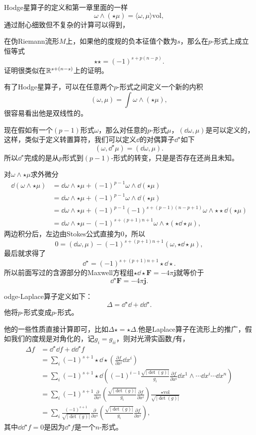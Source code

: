 Hodge星算子的定义和第一章里面的一样
\[
	\omega\wedge(\star \mu)=\langle \omega,\mu\rangle \mathrm{vol},
\]
通过耐心细致但不复杂的计算可以得到，

\pro 在伪Riemann流形$M$上，如果他的度规的负本征值个数为$s$，那么在$p$-形式上成立恒等式
	\[\star\star=(-1)^{s+p(n-p)}.\]
证明很类似在$\mathbb{R}^{s+(n-s)}$上的证明。

有了Hodge星算子，可以在任意两个$p$-形式之间定义一个新的内积
\[
	(\omega,\mu)=\int \omega\wedge(\star \mu),
\]
很容易看出他是双线性的。

现在假如有一个$(p-1)$形式$\omega$，那么对任意的$p$-形式$\mu$，$(\dd \omega,\mu)$是可以定义的，这样，类似于定义转置算符，我们可以定义$\dd$的对偶算子$\dd^\star$如下
\[
	(\omega,\dd^\star\mu)=(\dd \omega,\mu).
\]
所以$\dd^\star$完成的是从$p$形式到$(p-1)$-形式的转变，只是是否存在还尚且未知。

对$\omega\wedge\star\mu$求外微分
\begin{align*}
	\dd (\omega\wedge\star\mu)&=\dd \omega\wedge\star\mu+(-1)^{p-1}\omega\wedge\dd(\star\mu)\\
	&=\dd \omega\wedge\star\mu+(-1)^{p-1}\omega\wedge\dd(\star\mu)\\
	&=\dd \omega\wedge\star\mu+(-1)^{p-1}(-1)^{s+(p-1)(n-p+1)}\omega\wedge\star\star\dd(\star\mu)\\
	&=\dd \omega\wedge\star\mu-(-1)^{s+(p+1)n+1}\omega\wedge\star(\star\dd\star\mu),
\end{align*}
两边积分后，左边由Stokes公式直接为0，所以
\[
	0=(\dd \omega,\mu)-(-1)^{s+(p+1)n+1}(\omega,\star\dd\star\mu),
\]
最后就求得了
\[
	\dd^\star=(-1)^{s+(p+1)n+1}\star\dd\star.
\]
所以前面写过的含源部分的Maxwell方程组$\star\dd \star \mathbf{F}=-4\pi\mathbf{j}$就等价于
\[
	\dd^\star \mathbf{F}=-4\pi\mathbf{j}.
\]

\para odge-Laplace算子定义如下：
\[
	\Delta=\dd^\star\dd+\dd\dd^\star.
\]
他将$p$-形式变成$p$-形式。

他的一些性质直接计算即可，比如$\Delta\star=\star\Delta$.他是Laplace算子在流形上的推广，假如我们的度规是对角化的，记$g_i=g_{i i}$，则对光滑实函数$f$有，
\begin{align*}
	\Delta f&=\dd^\star\dd f+\dd\dd^\star f\\
	&=\sum_i(-1)^{s+1}\star\dd\star\left(\frac{\partial f}{\partial x^i}\dd x^i\right)\\
	&=\sum_i(-1)^{s+1}\star\dd\left((-1)^{i-1}\frac{\sqrt{|\det(g)|}}{g_i} \frac{\partial f}{\partial x^i}\dd x^1\wedge\cdots\hat{\dd x^i}\cdots\dd x^n\right)\\
	&=\sum_i(-1)^{s+1}\frac{\partial}{\partial x^i}\left(\frac{\sqrt{|\det(g)|}}{g_i} \frac{\partial f}{\partial x^i}\right)\frac{\star\mathrm{vol}}{\sqrt{|\det(g)|}}\\
	&=\sum_i\frac{(-1)^{s+1}}{\sqrt{|\det(g)|}}\frac{\partial}{\partial x^i}\left(\frac{\sqrt{|\det(g)|}}{g_i} \frac{\partial f}{\partial x^i}\right),
\end{align*}
其中$\dd\dd^\star f=0$是因为$\dd^\star f$是一个$n$-形式。

